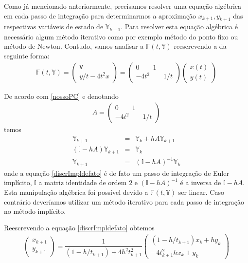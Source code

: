 \documentclass[amsmath,amssymb,floatfix]{revtex4}
\begin{document}
Como já mencionado anteriormente, precisamos resolver uma equação algébrica em cada passo de integração para determinarmos a aproximação $x_{k+1},y_{k+1}$ das respectivas variáveis de estado de $\mathbb{Y}_{k+1}$. Para resolver esta equação algébrica é necessário algum método iterativo como por exemplo método do ponto fixo ou método de Newton. Contudo, vamos analisar a $\mathbb{F}(t, \mathbb{Y})$ reescrevendo-a da seguinte forma:
\begin{eqnarray}\label{Fimplicito}
 \mathbb{F}(t,\mathbb{Y})
  = \begin{pmatrix} y \\ y/t - 4t^2x \end{pmatrix} 
  = \begin{pmatrix} 0 \qquad 1 \\ - 4t^2 \qquad 1/t\end{pmatrix}
  \begin{pmatrix} x(t) \\ y(t) \end{pmatrix}
 \end{eqnarray}

De acordo com \eqref{nossoPC} e denotando 
\begin{eqnarray*}
A 
= \begin{pmatrix} 0 \qquad 1 \\ - 4t^2 \qquad 1/t\end{pmatrix}
\end{eqnarray*}
temos
\begin{eqnarray}\label{discrImpldefato}
\mathbb{Y}_{k+1} &=& \mathbb{Y}_k + h A \mathbb{Y}_{k+1} \nonumber \\
(\mathbb{I} - hA) \mathbb{Y}_{k+1} &=& \mathbb{Y}_k \nonumber \\
\mathbb{Y}_{k+1} &=& (\mathbb{I} - hA)^{-1} \mathbb{Y}_k
\end{eqnarray}
onde a equação \eqref{discrImpldefato} é de fato um passo de integração de Euler implícito, $\mathbb{I}$ a matriz identidade de ordem $2$ e $(\mathbb{I} - hA)^{-1}$ é a inversa de $\mathbb{I} - hA$. Esta manipulação algébrica foi possível devido a $\mathbb{F}(t, \mathbb{Y})$ ser linear. Caso contrário deveríamos utilizar um método iterativo para cada passo de integração no método implícito. 

Reescrevendo a equação \eqref{discrImpldefato} obtemos
\begin{eqnarray}\label{Fimplicito}
 \begin{pmatrix} x_{k+1} \\ y_{k+1} \end{pmatrix} 
  = \dfrac{1}{{(1-h/t_{k+1})} + 4h^2t_{k+1}^2} \begin{pmatrix} (1-h/t_{k+1})x_k + hy_k \\ - 4t_{k+1}^2hx_k + y_k \end{pmatrix}
   \end{eqnarray}
\end{document}
